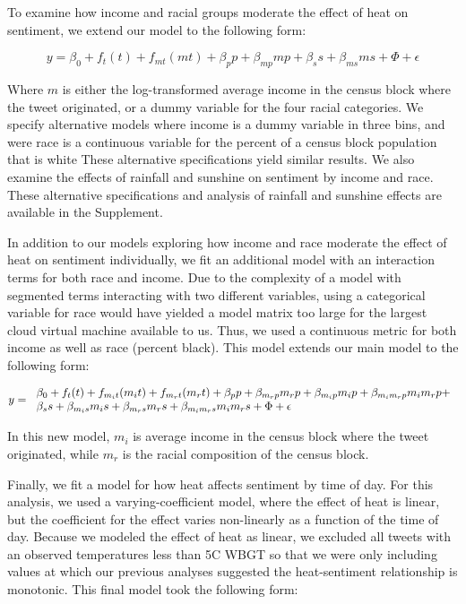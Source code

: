 \documentclass[fleqn,10pt]{wlscirep}
\begin{document}
To examine how income and racial groups moderate the effect of heat on sentiment, we extend our model to the following form:

\begin{equation}
    y = \beta_0 + f_t(t) + f_{mt}(m t) + \beta_p p + \beta_{mp} m p + \beta_s s + \beta_{ms} m s + \Phi + \epsilon
    \label{mod:2}
\end{equation}

Where $m$ is either the log-transformed average income in the census block where the tweet originated, or a dummy variable for the four racial categories.  We specify alternative models where income is a dummy variable in three bins, and were race is a continuous variable for the percent of a census block population that is white These alternative specifications yield similar results.  We also examine the effects of rainfall and sunshine on sentiment by income and race.  These alternative specifications and analysis of rainfall and sunshine effects are available in the Supplement.

In addition to our models exploring how income and race moderate the effect of heat on sentiment individually, we fit an additional model with an interaction terms for both race and income.  Due to the complexity of a model with segmented terms interacting with two different variables, using a categorical variable for race would have yielded a model matrix too large for the largest cloud virtual machine available to us.  Thus, we used a continuous metric for both income as well as race (percent black).  This model extends our main model to the following form:

\begin{equation}
    y = \begin{tabular}{l}
    $\beta_0 + f_t(t) + f_{m_{i}t}(m_{i} t) + f_{m_{r}t}(m_{r} t) + 
    \beta_p p + \beta_{m_{r} p} m_{r} p + 
    \beta_{m_{i} p} m_{i} p + \beta_{m_{i} m_{r} p} m_{i} m_{r} p + $
    \\
    $\beta_s s + \beta_{m_{i} s} m_{i} s + 
    \beta_{m_{r} s} m_{r} s + \beta_{m_{i} m_{r} s} m_{i} m_{r} s + 
    \Phi + \epsilon$
    \end{tabular}
    \label{mod:race-inc}
\end{equation}

In this new model, $m_{i}$ is average income in the census block where the tweet originated, while $m_{r}$ is the racial composition of the census block.

Finally, we fit a model for how heat affects sentiment by time of day.  For this analysis, we used a varying-coefficient model, where the effect of heat is linear, but the coefficient for the effect varies non-linearly as a function of the time of day.  Because we modeled the effect of heat as linear, we excluded all tweets with an observed temperatures less than 5\textdegree C WBGT so that we were only including values at which our previous analyses suggested the heat-sentiment relationship is monotonic.  This final model took the following form:
\end{document}
